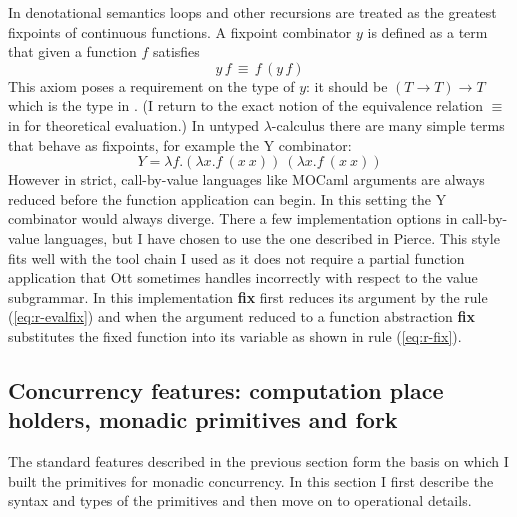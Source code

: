 \documentclass[12pt,twoside,notitlepage]{report}
\theoremstyle{plain}%
\theoremstyle{definition}
\theoremstyle{remark}
\begin{document}
In denotational semantics loops and other recursions are treated as the greatest fixpoints of continuous functions. A fixpoint combinator $ y $ is defined as a term that given a function $ f $ satisfies
\[ y\,f\,\equiv\, f\,(y\,f) \] 
This axiom poses a requirement on the type of $ y $: it should be $ (T \rightarrow T) \rightarrow T $ which is the type in . (I return to the exact notion of the equivalence relation $ \equiv $ in  for theoretical evaluation.)
In untyped $ \lambda $-calculus there are many simple terms that behave as fixpoints, for example the Y combinator:
\[ Y = \lambda f.(\lambda x.f\ (x\ x))\ (\lambda x.f\ (x\ x))  \]
However in strict, call-by-value languages like MOCaml arguments are always reduced before the function application can begin. In this setting the Y combinator would always diverge. There a few implementation options in call-by-value languages, but I have chosen to use the one described in Pierce\cite[p.~144]{pierce2002types}. This style fits well with the tool chain I used as it does not require a partial function application that Ott sometimes handles incorrectly with respect to the value subgrammar. In this implementation \textbf{fix} first reduces its argument by the rule (\ref{eq:r-evalfix}) and when the argument reduced to a function abstraction \textbf{fix} substitutes the fixed function into its variable as shown in rule (\ref{eq:r-fix}).
\clearpage

\subsection{Concurrency features: computation place holders, monadic primitives and fork}
The standard features described in the previous section form the basis on which I built the primitives for monadic concurrency. In this section I first describe the syntax and types of the primitives and then move on to operational details.
\end{document}
